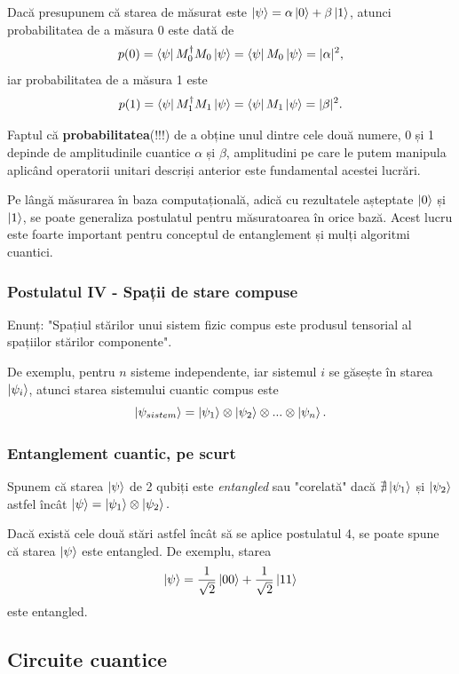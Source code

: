 Dacă presupunem că starea de măsurat este $\ket{\psi} = \alpha\ket{0} + \beta\ket{1}$, atunci probabilitatea de a măsura 0 este dată de 
\[
p(0) = \bra{\psi}M_0^\dagger M_0 \ket{\psi} = \bra{\psi} M_0 \ket{\psi} = |\alpha|^2,
\]
iar probabilitatea de a măsura 1 este
\[
p(1) = \bra{\psi}M_1^\dagger M_1 \ket{\psi} = \bra{\psi} M_1 \ket{\psi} = |\beta|^2.
\]

Faptul că \textbf{probabilitatea}(!!!) de a obține unul dintre cele două numere, 0 și 1 depinde de amplitudinile cuantice $\alpha$ și $\beta$, amplitudini pe care le putem manipula aplicând operatorii unitari descriși anterior este fundamental acestei lucrări. 

Pe lângă măsurarea în baza computațională, adică cu rezultatele așteptate $\ket{0}$ și $\ket{1}$, se poate generaliza postulatul pentru măsuratoarea în orice bază. Acest lucru este foarte important pentru conceptul de entanglement și mulți algoritmi cuantici.

\subsubsection{\textbf{Postulatul IV} - Spații de stare compuse}

Enunț: "Spațiul stărilor unui sistem fizic compus este produsul tensorial al spațiilor stărilor componente".

De exemplu, pentru $n$ sisteme independente, iar sistemul $i$ se găsește în starea $\ket{\psi_i}$, atunci starea sistemului cuantic compus este 
\[
\ket{\psi_{sistem}} = \ket{\psi_1} \otimes \ket{\psi_2} \otimes ... \otimes \ket{\psi_n}.
\]

\subsubsection{Entanglement cuantic, pe scurt}
Spunem că starea $\ket{\psi}$ de 2 qubiți este \textit{entangled} sau "corelată" dacă $\nexists \ket{\psi_1}$ și $\ket{\psi_2}$ astfel încât $\ket{\psi} = \ket{\psi_1} \otimes \ket{\psi_2}.$

Dacă există cele două stări astfel încât să se aplice postulatul 4, se poate spune că starea $\ket{\psi}$ este entangled. De exemplu, starea
\[
\ket{\psi} = \frac{1}{\sqrt{2}}\ket{00} + \frac{1}{\sqrt{2}}\ket{11} 
\] este entangled.

\subsection{Circuite cuantice}

